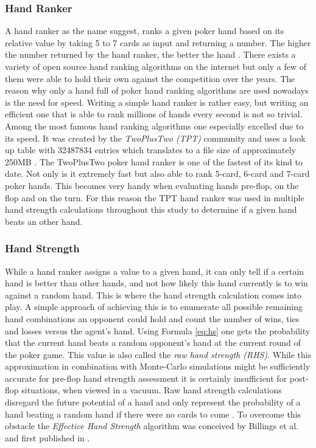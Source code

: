 \subsubsection{Hand Ranker}
A hand ranker as the name suggest, ranks a given poker hand based on its relative value by taking 5 to 7 cards as input and returning a number. The higher the number returned by the hand ranker, the better the hand \cite{hand_eval}. There exists a variety of open source hand ranking algorithms on the internet but only a few of them were able to hold their own against the competition over the years. The reason why only a hand full of poker hand ranking algorithms are used nowadays is the need for speed. Writing a simple hand ranker is rather easy, but writing an efficient one that is able to rank millions of hands every second is not so trivial. Among the most famous hand ranking algorithms one especially excelled due to its speed. It was created by the \textit{TwoPlusTwo (TPT)} community and uses a look up table with 32487834 entries which translates to a file size of approximately 250MB \cite{hand_eval}. The TwoPlusTwo poker hand ranker is one of the fastest of its kind to date. Not only is it extremely fast but also able to rank 5-card, 6-card and 7-card poker hands. This becomes very handy when evaluating hands pre-flop, on the flop and on the turn. For this reason the TPT hand ranker was used in multiple hand strength calculations throughout this study to determine if a given hand beats an other hand. 
\subsubsection{Hand Strength}
\label{subsubsec:hs}
While a hand ranker assigns a value to a given hand, it can only tell if a certain hand is better than other hands, and not how likely this hand currently is to win against a random hand. This is where the hand strength calculation comes into play. A simple approach of achieving this is to enumerate all possible remaining hand combinations an opponent could hold and count the number of wins, ties and losses versus the agent's hand. Using Formula \ref{eq:hs} one gets the probability that the current hand beats a random opponent's hand at the current round of the poker game. This value is also called the \textit{raw hand strength (RHS)}. While this approximation in combination with Monte-Carlo simulations might be sufficiently accurate for pre-flop hand strength assessment it is certainly insufficient for post-flop situations, when viewed in a vacuum. Raw hand strength calculations disregard the future potential of a hand and only represent the probability of a hand beating a random hand if there were no cards to come \cite{opp_master}. To overcome this obstacle the \textit{Effective Hand Strength} algorithm was conceived by Billings et al. and first published in \cite{opp_modeling}.
